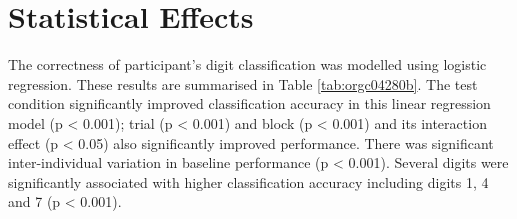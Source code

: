 \documentclass[a4paper,11pt,openany]{book}
\begin{document}
\section*{Statistical Effects}
\label{sec:orgea5abe4}

The correctness of participant's digit classification was modelled using logistic regression. These results are summarised in Table \ref{tab:orgc04280b}.
The test condition significantly improved classification accuracy in this linear regression model (p < 0.001); trial (p < 0.001) and block (p < 0.001) and its interaction effect (p < 0.05) also significantly improved performance.
There was significant inter-individual variation in baseline performance (p < 0.001).
Several digits were significantly associated with higher classification accuracy including digits 1, 4 and 7 (p < 0.001).
\end{document}
